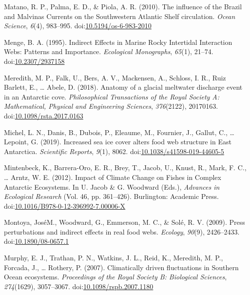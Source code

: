 \documentclass[
]{article}
\newlength{\cslhangindent}
\newenvironment{CSLReferences}[2] %
 {\begin{list}{}{%
  \setlength{\itemindent}{0pt}
  \setlength{\leftmargin}{0pt}
  \setlength{\parsep}{0pt}
  \ifodd #1
   \setlength{\leftmargin}{\cslhangindent}
   \setlength{\itemindent}{-1\cslhangindent}
  \fi
  \setlength{\itemsep}{#2\baselineskip}}}
 {\end{list}}
\begin{document}
\begin{CSLReferences}{1}{0}
Matano, R. P., Palma, E. D., \& Piola, A. R. (2010). The influence of
the {Brazil} and {Malvinas Currents} on the {Southwestern Atlantic
Shelf} circulation. \emph{Ocean Science}, \emph{6}(4), 983--995.
doi:\href{https://doi.org/10.5194/os-6-983-2010}{10.5194/os-6-983-2010}

Menge, B. A. (1995). Indirect {Effects} in {Marine Rocky Intertidal
Interaction Webs}: {Patterns} and {Importance}. \emph{Ecological
Monographs}, \emph{65}(1), 21--74.
doi:\href{https://doi.org/10.2307/2937158}{10.2307/2937158}

Meredith, M. P., Falk, U., Bers, A. V., Mackensen, A., Schloss, I. R.,
Ruiz Barlett, E., \ldots{} Abele, D. (2018). Anatomy of a glacial
meltwater discharge event in an {Antarctic} cove. \emph{Philosophical
Transactions of the Royal Society A: Mathematical, Physical and
Engineering Sciences}, \emph{376}(2122), 20170163.
doi:\href{https://doi.org/10.1098/rsta.2017.0163}{10.1098/rsta.2017.0163}

Michel, L. N., Danis, B., Dubois, P., Eleaume, M., Fournier, J., Gallut,
C., \ldots{} Lepoint, G. (2019). Increased sea ice cover alters food web
structure in {East Antarctica}. \emph{Scientific Reports}, \emph{9}(1),
8062.
doi:\href{https://doi.org/10.1038/s41598-019-44605-5}{10.1038/s41598-019-44605-5}

Mintenbeck, K., Barrera-Oro, E. R., Brey, T., Jacob, U., Knust, R.,
Mark, F. C., \ldots{} Arntz, W. E. (2012). Impact of {Climate Change} on
{Fishes} in {Complex Antarctic Ecosystems}. In U. Jacob \& G. Woodward
(Eds.), \emph{Advances in {Ecological Research}} (Vol. 46, pp.
361--426). {Burlington}: {Academic Press}.
doi:\href{https://doi.org/10.1016/B978-0-12-396992-7.00006-X}{10.1016/B978-0-12-396992-7.00006-X}

Montoya, JoséM., Woodward, G., Emmerson, M. C., \& Solé, R. V. (2009).
Press perturbations and indirect effects in real food webs.
\emph{Ecology}, \emph{90}(9), 2426--2433.
doi:\href{https://doi.org/10.1890/08-0657.1}{10.1890/08-0657.1}

Murphy, E. J., Trathan, P. N., Watkins, J. L., Reid, K., Meredith, M.
P., Forcada, J., \ldots{} Rothery, P. (2007). Climatically driven
fluctuations in {Southern Ocean} ecosystems. \emph{Proceedings of the
Royal Society B: Biological Sciences}, \emph{274}(1629), 3057--3067.
doi:\href{https://doi.org/10.1098/rspb.2007.1180}{10.1098/rspb.2007.1180}


\end{CSLReferences}
\end{document}
